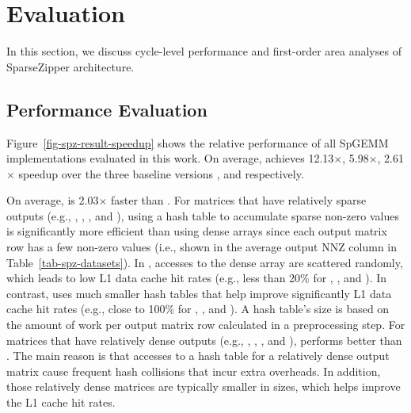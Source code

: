 
\section{Evaluation}
\label{sec-spz-perf-eval}





%

In this section, we discuss cycle-level performance and first-order area
analyses of SparseZipper architecture.

\subsection{Performance Evaluation}

Figure~\ref{fig-spz-result-speedup} shows the relative performance of all
SpGEMM implementations evaluated in this work.
On average,  achieves 12.13$\times$, 5.98$\times$, 2.61$\times$
speedup over the three baseline versions ,  and
 respectively.

On average,  is 2.03$\times$ faster than .
For matrices that have relatively sparse outputs (e.g., , ,
, and ), using a hash table to accumulate sparse non-zero
values is significantly more efficient than using dense arrays since each
output matrix row has a few non-zero values (i.e., shown in the average output
NNZ column in Table~\ref{tab-spz-datasets}).
In , accesses to the dense array are scattered randomly, which
leads to low L1 data cache hit rates (e.g., less than 20\% for ,
, and ).
In contrast,  uses much smaller hash tables that help improve
significantly L1 data cache hit rates (e.g., close to 100\% for ,
, and ).
A hash table's size is based on the amount of work per output matrix row
calculated in a preprocessing step.
For matrices that have relatively dense outputs (e.g., , ,
, and ),  performs better than
.
The main reason is that accesses to a hash table for a relatively dense output
matrix cause frequent hash collisions that incur extra overheads.
In addition, those relatively dense matrices are typically smaller in sizes,
which helps improve the L1 cache hit rates.

